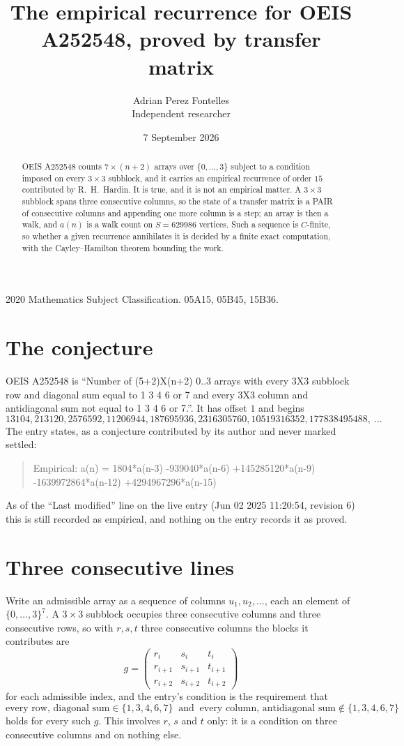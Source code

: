 \documentclass[11pt,a4paper]{article}
\title{The empirical recurrence for OEIS A252548, proved by transfer matrix}
\author{Adrian Perez Fontelles\\ \small Independent researcher}
\date{7 September 2026}
\theoremstyle{plain}
\theoremstyle{definition}
\begin{document}
\maketitle

\begin{abstract}
OEIS A252548 counts $7\times(n+2)$ arrays over $\{0,\dots,3\}$ subject to a condition imposed on
every $3\times3$ subblock, and it carries an empirical recurrence of order $15$
contributed by R.~H.~Hardin. It is true, and it is not an empirical matter. A $3\times3$
subblock spans three consecutive columns, so the state of a transfer matrix is a PAIR of
consecutive columns and appending one more column is a step; an array is then a walk, and
$a(n)$ is a walk count on $S=629986$ vertices. Such a sequence is $C$-finite, so whether a given
recurrence annihilates it is decided by a finite exact computation, with the Cayley--Hamilton
theorem bounding the work.
\end{abstract}

\noindent\small 2020 Mathematics Subject Classification. 05A15, 05B45, 15B36.\normalsize

\section{The conjecture}

OEIS A252548 is ``Number of (5+2)X(n+2) 0..3 arrays with every 3X3 subblock row and diagonal sum equal to 1 3 4 6 or 7 and every 3X3 column and antidiagonal sum not equal to 1 3 4 6 or 7.''. It has offset $1$ and begins
\[
13104, 213120, 2576592, 11206944, 187695936, 2316305760, 10519316352, 177838495488,\ \dots
\]
The entry states, as a conjecture contributed by its author and never marked settled:
\begin{quote}
Empirical: a(n) = 1804*a(n-3) -939040*a(n-6) +145285120*a(n-9) -1639972864*a(n-12) +4294967296*a(n-15)
\end{quote}
As of the ``Last modified'' line on the live entry (Jun 02 2025 11:20:54, revision 6) this is still
recorded as empirical, and nothing on the entry records it as proved.

\section{Three consecutive lines}

Write an admissible array as a sequence of columns $u_1,u_2,\dots$, each an element of
$\{0,\dots,3\}^{7}$. A $3\times3$ subblock occupies three consecutive columns and
three consecutive rows, so with $r,s,t$ three consecutive columns the blocks it
contributes are
\[
g=\begin{pmatrix}r_i&s_i&t_i\\ r_{i+1}&s_{i+1}&t_{i+1}\\ r_{i+2}&s_{i+2}&t_{i+2}\end{pmatrix}
\]
for each admissible index, and the entry's condition is the requirement that
\[
\text{every row, diagonal sum} \in \{1,3,4,6,7\}\ \text{ and }\ \text{every column, antidiagonal sum} \notin \{1,3,4,6,7\}
\]
holds for every such $g$. This involves $r$, $s$ and $t$ only: it is a condition on
three consecutive columns and on nothing else.
\end{document}

